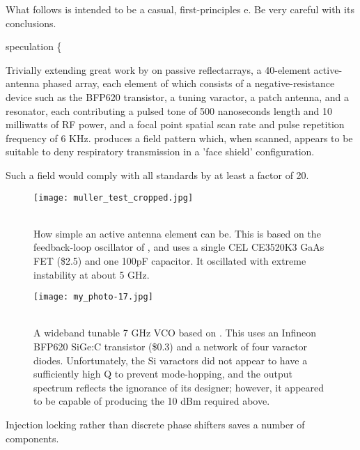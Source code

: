 \documentclass[paper.tex]{subfiles}
\begin{document}
\begin{autem}
What follows is intended to be a casual, first-principles e. Be very careful with its conclusions.
\end{autem}

{\color{red} speculation \{ } 

Trivially extending great work by \cite{Focusing} on passive reflectarrays, a 40-element active-antenna phased array, each element of which consists of a negative-resistance device such as the BFP620 transistor, a tuning varactor, a patch antenna, and a resonator, each contributing a pulsed tone of 500 nanoseconds length and 10 milliwatts of RF power, and a focal point spatial scan rate and pulse repetition frequency of 6 KHz. produces a field pattern which, when scanned, appears to be suitable to deny respiratory transmission in a 'face shield' configuration. 

Such a field would comply with all standards by at least a factor of 20.


\begin{figure}[H]
	\captionsetup{singlelinecheck = false, justification=justified}
	\centering
	\texttt{[image: muller\_test\_cropped.jpg]}
	\caption{\\ How simple an active antenna element can be. This is based on the feedback-loop oscillator of \cite{SmallSize2008}, and uses a single CEL CE3520K3 GaAs FET (\$2.5) and one 100pF capacitor. It oscillated with extreme instability at about 5 GHz.}
\end{figure}


\begin{figure}[H]
	\captionsetup{singlelinecheck = false, justification=justified}
	\centering
	\texttt{[image: my\_photo-17.jpg]}
	\caption{\\ A wideband tunable 7 GHz VCO based on \cite{TripleTuned2008}. This uses an Infineon BFP620 SiGe:C transistor (\$0.3) and a network of four varactor diodes. Unfortunately, the Si varactors did not appear to have a sufficiently high Q to prevent mode-hopping, and the output spectrum reflects the ignorance of its designer; however, it appeared to be capable of producing the 10 dBm required above.}
\end{figure}





Injection locking rather than discrete phase shifters saves a number of components.
\end{document}
